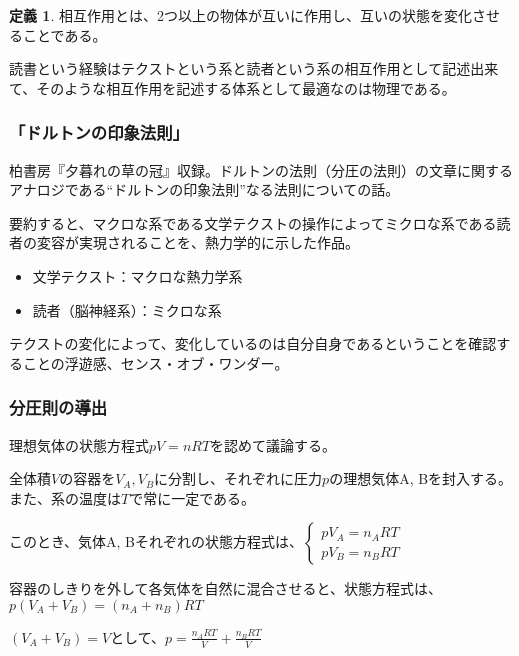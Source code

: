 \documentclass[10pt, a5paper, twoside]{jsarticle}
\theoremstyle{definition}
\newtheorem{dfn}{定義}
\begin{document}
			\begin{dfn}

				相互作用とは、2つ以上の物体が互いに作用し、互いの状態を変化させることである。
			
			\end{dfn}

			読書という経験はテクストという系と読者という系の相互作用として記述出来て、そのような相互作用を記述する体系として最適なのは物理である。

			\subsubsection{「ドルトンの印象法則」}

				柏書房『夕暮れの草の冠』収録。ドルトンの法則（分圧の法則）の文章に関するアナロジである“ドルトンの印象法則”なる法則についての話。

				要約すると、マクロな系である文学テクストの操作によってミクロな系である読者の変容が実現されることを、熱力学的に示した作品。

				\begin{itemize}

					\item 文学テクスト：マクロな熱力学系

					\item 読者（脳神経系）：ミクロな系

				\end{itemize}

				テクストの変化によって、変化しているのは自分自身であるということを確認することの浮遊感、センス・オブ・ワンダー。

			\subsubsection*{分圧則の導出}

				理想気体の状態方程式$ pV = nRT $を認めて議論する。

				全体積$ V $の容器を$ V_A , V_B $に分割し、それぞれに圧力$ p $の理想気体A, Bを封入する。また、系の温度は$ T $で常に一定である。

				このとき、気体A, Bそれぞれの状態方程式は、$ \begin{cases} p V_A = n_A R T \\ p V_B = n_B R T \end{cases} $

				容器のしきりを外して各気体を自然に混合させると、状態方程式は、$ p (V_A + V_B) = (n_A + n_B) RT$

				$ (V_A + V_B) = V $として、$ p = \frac{n_A R T}{V} + \frac{n_B R T}{V} $
\end{document}
